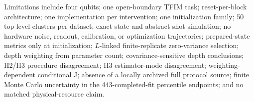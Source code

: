 \documentclass[pdflatex,sn-basic,Numbered]{sn-jnl}
\begin{document}
Limitations include four qubits; one open-boundary TFIM task; reset-per-block architecture; one implementation per intervention; one initialization family; 50 top-level clusters per dataset; exact-state and abstract shot simulation; no hardware noise, readout, calibration, or optimization trajectories; prepared-state metrics only at initialization; $L$-linked finite-replicate zero-variance selection; depth weighting from parameter count; covariance-sensitive depth conclusions; H2/H3 procedure disagreement; H3 estimator-mode disagreement; weighting-dependent conditional J; absence of a locally archived full protocol source; finite Monte Carlo uncertainty in the 443-completed-fit percentile endpoints; and no matched physical-resource claim.
\end{document}
